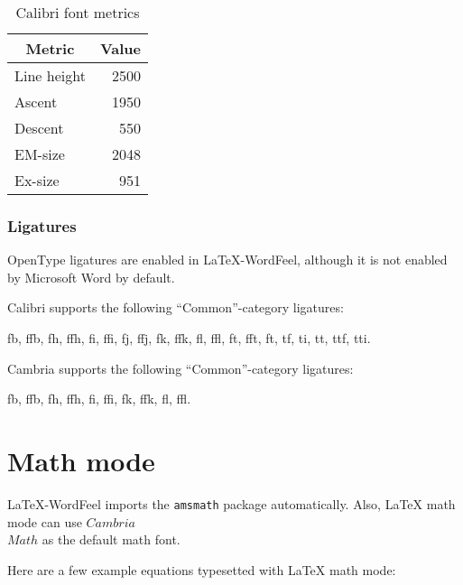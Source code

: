 \documentclass[letterpaper]{wordfeel}
\begin{document}
\begin{table}[htb]
    \centering
    \caption{Calibri font metrics}
    \label{tab:font-metrics}
    \begin{tabular}{lr}
        \toprule
        \multicolumn{1}{c}{Metric} & \multicolumn{1}{c}{Value}\\
        \midrule
        Line height & 2500 \\
        Ascent & 1950 \\
        Descent & 550 \\
        EM-size & 2048 \\
        Ex-size & 951 \\
        \bottomrule
    \end{tabular}
\end{table}

\FloatBarrier

\subsubsection{Ligatures}

OpenType ligatures are enabled in \LaTeX-WordFeel, although it is not enabled by Microsoft Word by default.

Calibri supports the following ``Common''-category ligatures:

{\LARGE fb, ffb, fh, ffh, fi, ffi, fj, ffj, fk, ffk, fl, ffl, ft, fft, ft, tf, ti, tt, ttf, tti.}

\textrm{Cambria} supports the following ``Common''-category ligatures:

{\LARGE\rmfamily fb, ffb, fh, ffh, fi, ffi, fk, ffk, fl, ffl.}

\section{Math mode}

\LaTeX-WordFeel imports the \texttt{amsmath} package automatically. Also, \LaTeX{} math mode can use $Cambria$\\$Math$ as the default math font.

Here are a few example equations typesetted with \LaTeX{} math mode:
\end{document}
